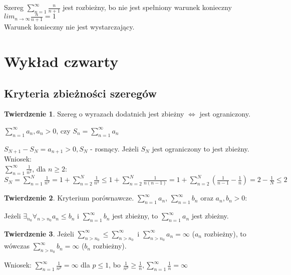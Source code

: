 \documentclass{article}
\theoremstyle{definition}
\theoremstyle{definition}
\newtheorem{tw}{Twierdzenie}[subsection]
\theoremstyle{definition}
\theoremstyle{definition}
\begin{document}
Szereg $\sum_{n=1}^{\infty} \frac{n}{n+1}$ jest rozbieżny, bo nie jest spełniony warunek konieczny\\ $lim_{n\rightarrow \infty} \frac{n}{n+1}=1$\\
Warunek konieczny nie jest wystarczający.

\section{Wykład czwarty}

\subsection{Kryteria zbieżności szeregów}

\begin{tw}
    Szereg o wyrazach dodatnich jest zbieżny $\iff$ jest ograniczony.\\
    \begin{center}
        $\sum_{n=1}^{\infty} a_n, a_n>0$, czy $S_n = \sum_{n=1}^{\infty} a_n$
    \end{center}
    $S_{N+1}-S_{N}=a_{n+1} > 0, S_N$ - rosnący. Jeżeli $S_N$ jest ograniczony to jest zbieżny.\\
    Wniosek:\\
    $\sum_{n=1}^{\infty} \frac{1}{n^2}$, dla $n\geq 2$:\\
    $S_N=\sum_{n=1}^{N} \frac{1}{n^2}=1+\sum_{n=2}^{N} \frac{1}{n^2}\leq 1 + \sum_{n=2}^{N} \frac{1}{n(n-1)} = 1 + \sum_{n=2}^{N} (\frac{1}{n-1} - \frac{1}{n}) = 2 - \frac{1}{N} \leq 2$
\end{tw}

\begin{tw}
    Kryterium porównawcze. $\sum_{n=1}^{\infty} a_n$, $\sum_{n=1}^{\infty} b_n$ oraz $a_n, b_n > 0$:
    \begin{center}
    Jeżeli $\exists_{n_0}\forall_{n>n_0} a_n\leq b_n$ i $\sum_{n=1}^{\infty} b_n$ jest zbieżny, to $\sum_{n=1}^{\infty} a_n$ jest zbieżny.\\
    \end{center}
\end{tw}

\begin{tw}
    Jeżeli $\sum_{n>n_0}^{\infty} \leq \sum_{n>n_0}^{\infty}$ i $\sum_{n>n_0}^{\infty} a_n = \infty$ ($a_n$ rozbieżny),
    to wówczas $\sum_{n>n_0}^{\infty} b_n = \infty$ ($b_n$ rozbieżny).
\end{tw}

Wniosek: $\sum_{n=1}^{\infty} \frac{1}{n^p} = \infty$ dla $p\leq 1$, bo $\frac{1}{n^p} \geq \frac{1}{n}, \sum_{n=1}^{\infty} \frac{1}{n} = \infty$\\
\end{document}
